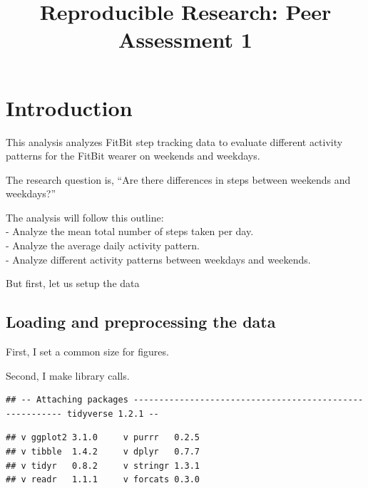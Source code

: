\documentclass[]{article}
\title{Reproducible Research: Peer Assessment 1}
\author{}
\date{}
\newenvironment{Shaded}{\begin{snugshade}}{\end{snugshade}}
\newcommand{\KeywordTok}[1]{\textcolor[rgb]{0.13,0.29,0.53}{\textbf{#1}}}
\newcommand{\DataTypeTok}[1]{\textcolor[rgb]{0.13,0.29,0.53}{#1}}
\newcommand{\DecValTok}[1]{\textcolor[rgb]{0.00,0.00,0.81}{#1}}
\newcommand{\OperatorTok}[1]{\textcolor[rgb]{0.81,0.36,0.00}{\textbf{#1}}}
\newcommand{\NormalTok}[1]{#1}
\begin{document}
\maketitle

\section{Introduction}\label{introduction}

This analysis analyzes FitBit step tracking data to evaluate different
activity patterns for the FitBit wearer on weekends and weekdays.

The research question is, ``Are there differences in steps between
weekends and weekdays?''

The analysis will follow this outline:\\
- Analyze the mean total number of steps taken per day.\\
- Analyze the average daily activity pattern.\\
- Analyze different activity patterns between weekdays and weekends.

But first, let us setup the data

\subsection{Loading and preprocessing the
data}\label{loading-and-preprocessing-the-data}

First, I set a common size for figures.

\begin{Shaded}
\end{Shaded}

Second, I make library calls.

\begin{verbatim}
## -- Attaching packages -------------------------------------------------------- tidyverse 1.2.1 --
\end{verbatim}

\begin{verbatim}
## v ggplot2 3.1.0     v purrr   0.2.5
## v tibble  1.4.2     v dplyr   0.7.7
## v tidyr   0.8.2     v stringr 1.3.1
## v readr   1.1.1     v forcats 0.3.0
\end{verbatim}
\end{document}
